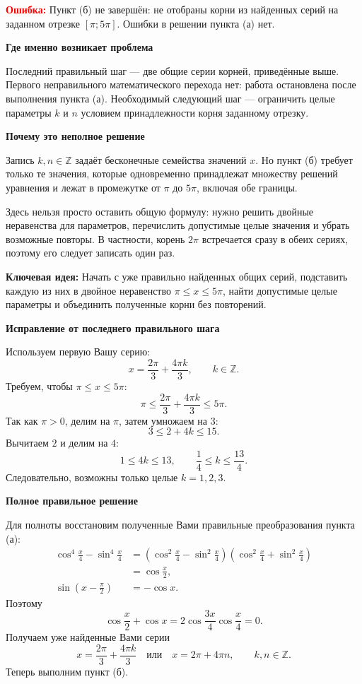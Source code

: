 \documentclass[11pt,a4paper]{article}
\newcommand{\err}[1]{\par\textcolor{red}{\textbf{Ошибка:}} #1\par}
\newcommand{\keyidea}[1]{\par\textcolor{blue!60!black}{\textbf{Ключевая идея:}} #1\par}
\newcommand{\itemhead}[1]{\par\medskip\textbf{#1}\par}
\begin{document}
\err{Пункт (б) не завершён: не отобраны корни из найденных серий
на заданном отрезке $[\pi;5\pi]$. Ошибки в решении пункта (а) нет.}

\itemhead{Где именно возникает проблема}
Последний правильный шаг --- две общие серии корней,
приведённые выше. Первого неправильного математического перехода нет:
работа остановлена после выполнения пункта (а).
Необходимый следующий шаг --- ограничить целые параметры $k$ и $n$
условием принадлежности корня заданному отрезку.

\itemhead{Почему это неполное решение}
Запись $k,n\in\mathbb Z$ задаёт бесконечные семейства значений $x$.
Но пункт (б) требует только те значения, которые одновременно
принадлежат множеству решений уравнения и лежат в промежутке
от $\pi$ до $5\pi$, включая обе границы.

Здесь нельзя просто оставить общую формулу: нужно решить двойные
неравенства для параметров, перечислить допустимые целые значения
и убрать возможные повторы. В частности, корень $2\pi$
встречается сразу в обеих сериях, поэтому его следует записать один раз.

\keyidea{Начать с уже правильно найденных общих серий, подставить
каждую из них в двойное неравенство $\pi\le x\le5\pi$,
найти допустимые целые параметры и объединить полученные корни
без повторений.}

\itemhead{Исправление от последнего правильного шага}
Используем первую Вашу серию:
\[
 x=\frac{2\pi}{3}+\frac{4\pi k}{3},\qquad k\in\mathbb Z.
\]
Требуем, чтобы $\pi\le x\le5\pi$:
\[
\pi\le\frac{2\pi}{3}+\frac{4\pi k}{3}\le5\pi.
\]
Так как $\pi>0$, делим на $\pi$, затем умножаем на $3$:
\[
3\le2+4k\le15.
\]
Вычитаем $2$ и делим на $4$:
\[
1\le4k\le13,\qquad
\frac14\le k\le\frac{13}{4}.
\]
Следовательно, возможны только целые $k=1,2,3$.

\itemhead{Полное правильное решение}
Для полноты восстановим полученные Вами правильные преобразования
пункта (а):
\[
\begin{aligned}
\cos^4\frac{x}{4}-\sin^4\frac{x}{4}
&=\left(\cos^2\frac{x}{4}-\sin^2\frac{x}{4}\right)
\left(\cos^2\frac{x}{4}+\sin^2\frac{x}{4}\right)\\
&=\cos\frac{x}{2},\\
\sin\left(x-\frac\pi2\right)&=-\cos x.
\end{aligned}
\]
Поэтому
\[
\cos\frac{x}{2}+\cos x
=2\cos\frac{3x}{4}\cos\frac{x}{4}=0.
\]
Получаем уже найденные Вами серии
\[
\boxed{x=\frac{2\pi}{3}+\frac{4\pi k}{3}}
\quad\text{или}\quad
\boxed{x=2\pi+4\pi n},\qquad k,n\in\mathbb Z.
\]
Теперь выполним пункт (б).
\end{document}
